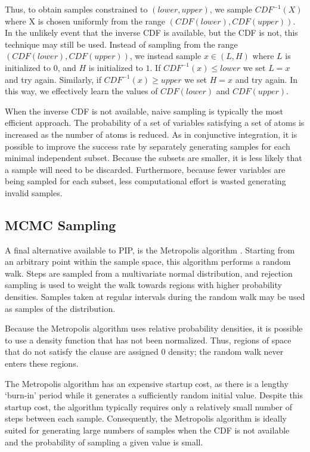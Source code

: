 Thus, to obtain samples constrained  to  $(lower, upper)$, we
sample  $CDF^{-1}(X)$  where X  is  chosen  uniformly  from the  range
$(CDF(lower), CDF(upper))$.   In the  unlikely event that  the inverse
CDF is  available, but  the CDF  is not, this  technique may  still be
used.  Instead of sampling  from the range $(CDF(lower), CDF(upper))$,
we instead sample  $x \in (L,H)$ where $L$ is  initialized to $0$, and
$H$ is initialized to $1$.  If $CDF^{-1}(x) \leq lower$ we set $L = x$
and try again.  Similarly, if $CDF^{-1}(x)  \geq upper$ we set $H = x$
and  try again.   In  this way,  we  effectively learn  the values  of
$CDF(lower)$ and $CDF(upper)$.

When the inverse CDF is not available, naive sampling is typically the
most  efficient  approach.  The  probability  of  a  set of  variables
satisfying  a set  of atoms  is increased  as the  number of  atoms is
reduced.  As in conjunctive integration, it is possible to improve the
success  rate  by  separately  generating  samples  for  each  minimal
independent  subset.  Because  the  subsets are  smaller,  it is  less
likely that a sample will  need to be discarded.  Furthermore, because
fewer variables are being  sampled for each subset, less computational
effort is wasted generating invalid samples.

\subsection{MCMC Sampling}
\label{subsec:MCMC}
A final alternative available to PIP, is the
Metropolis  algorithm \cite{metropolis}.   Starting from  an arbitrary
point within the sample space,  this algorithm performs a random walk.
Steps  are  sampled  from  a  multivariate  normal  distribution,  and
rejection sampling  is used  to weight the  walk towards  regions with
higher  probability  densities.  Samples  taken  at regular  intervals
during the random walk may be used as samples of the distribution.

Because the Metropolis  algorithm uses relative probability densities,
it is possible to use a density function that has not been normalized.
Thus, regions of  space that do not satisfy the  clause are assigned 0
density; the random walk never enters these regions.

The Metropolis algorithm has an  expensive startup cost, as there is a
lengthy  `burn-in' period  while  it generates  a sufficiently  random
initial  value.  Despite  this startup  cost, the  algorithm typically
requires only a relatively small  number of steps between each sample.
Consequently,   the  Metropolis  algorithm   is  ideally   suited  for
generating large numbers of samples  when the CDF is not available and
the probability of sampling a given value is small.


